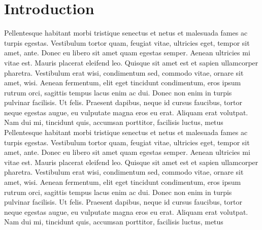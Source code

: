 
\chapter{Introduction}\label{sec:intro}
Pellentesque habitant morbi tristique senectus et netus et malesuada fames ac turpis egestas. Vestibulum tortor quam, feugiat vitae, ultricies eget, tempor sit amet, ante. Donec eu libero sit amet quam egestas semper. Aenean ultricies mi vitae est. Mauris placerat eleifend leo. Quisque sit amet est et sapien ullamcorper pharetra. Vestibulum erat wisi, condimentum sed, commodo vitae, ornare sit amet, wisi. Aenean fermentum, elit eget tincidunt condimentum, eros ipsum rutrum orci, sagittis tempus lacus enim ac dui. Donec non enim in turpis pulvinar facilisis. Ut felis. Praesent dapibus, neque id cursus faucibus, tortor neque egestas augue, eu vulputate magna eros eu erat. Aliquam erat volutpat. Nam dui mi, tincidunt quis, accumsan porttitor, facilisis luctus, metus
Pellentesque habitant morbi tristique senectus et netus et malesuada fames ac turpis egestas. Vestibulum tortor quam, feugiat vitae, ultricies eget, tempor sit amet, ante. Donec eu libero sit amet quam egestas semper. Aenean ultricies mi vitae est. Mauris placerat eleifend leo. Quisque sit amet est et sapien ullamcorper pharetra. Vestibulum erat wisi, condimentum sed, commodo vitae, ornare sit amet, wisi. Aenean fermentum, elit eget tincidunt condimentum, eros ipsum rutrum orci, sagittis tempus lacus enim ac dui. Donec non enim in turpis pulvinar facilisis. Ut felis. Praesent dapibus, neque id cursus faucibus, tortor neque egestas augue, eu vulputate magna eros eu erat. Aliquam erat volutpat. Nam dui mi, tincidunt quis, accumsan porttitor, facilisis luctus, metus


